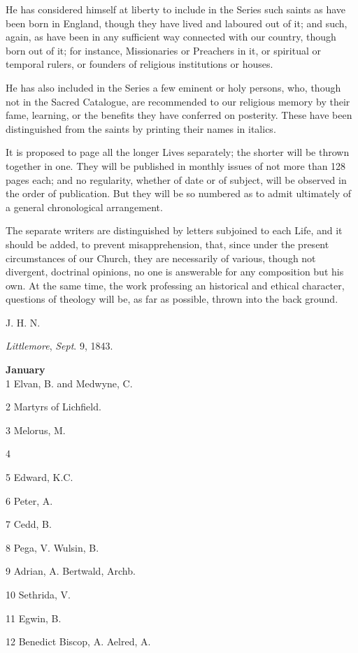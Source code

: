 He has considered himself at liberty to include in
the Series such saints as have been born in England, though they have
lived and laboured out of it; and such, again, as have been in any
sufficient way connected with our country, though born out of it; for
instance, Missionaries or Preachers in it, or spiritual or temporal
rulers, or founders of religious institutions or houses.

He has also included in the Series a few eminent or
holy persons, who, though not in the Sacred Catalogue, are recommended
to our religious memory by their fame, learning, or the benefits they
have conferred on posterity. These have been distinguished from the
saints by printing their names in italics.

It is proposed to page all the longer Lives
separately; the shorter will be thrown together in one. They will be
published in monthly issues of not more than 128 pages each; and no
regularity, whether of date or of subject, will be observed in the order
of publication. But they will be so numbered as to admit ultimately of a
general chronological arrangement.

The separate writers are distinguished by letters
subjoined to each Life, and it should be added, to prevent
misapprehension, that, since under the present circumstances of our
Church, they are necessarily of various, though not divergent, doctrinal
opinions, no one is answerable for any composition but his own. At the
same time, the work professing an historical and ethical character,
questions of theology will be, as far as possible, thrown into the back
ground.

J. H. N.

\emph{Littlemore}, \emph{Sept}. 9, 1843.


\textbf{January}\\
1 Elvan, B. and
Medwyne, C.

2 Martyrs of Lichfield.

3 Melorus, M.

4

5 Edward, K.C.

6 Peter, A.

7 Cedd, B.

8 Pega, V. Wulsin, B.

9 Adrian, A. Bertwald,
Archb.

10 Sethrida, V.

11 Egwin, B.

12 Benedict Biscop, A. Aelred, A.

